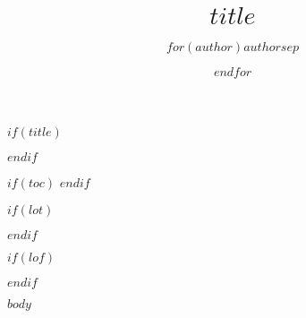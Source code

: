 \documentclass[$fontsize$,$lang$,$papersize$,$for(classoption)$$classoption$$sep$,$endfor$]{article}
\title{$title$}
\author{$for(author)$$author$$sep$ \and $endfor$}
\date{}
\begin{document}
$if(title)$
\maketitle
$endif$

$if(toc)$
{
\hypersetup{linkcolor=black}
\setcounter{tocdepth}{$toc-depth$}
\tableofcontents
}
$endif$

$if(lot)$
\listoftables
$endif$

$if(lof)$
\listoffigures
$endif$

$body$
\end{document}
